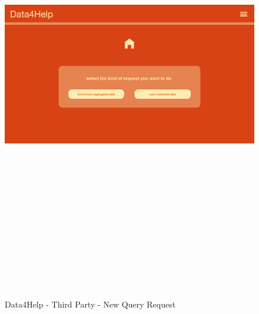 \begin{figure}[H]
    \includegraphics[width=.6\linewidth, height = 20cm, keepaspectratio]{./Images/Mockups/Data4Help/D4HTP/D4HTP_NewQueryRequest.png}
    \centering
    \caption{Data4Help - Third Party - New Query Request}
    \label{fig:sab}
\end{figure}


